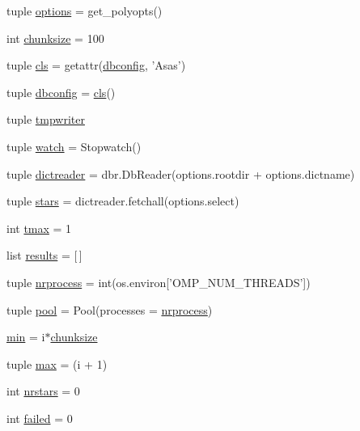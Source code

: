 \begin{DoxyCompactItemize}
\item 
tuple \hyperlink{namespacerunpolymp_a1696f14ff027e064a7d29eece7f4b66d}{options} = get\_\-polyopts()
\item 
int \hyperlink{namespacerunpolymp_aa79092d87180be0a238a99f8f9d7bef4}{chunksize} = 100
\item 
tuple \hyperlink{namespacerunpolymp_a792265f8b2a708d4ce5fdb59becb528a}{cls} = getattr(\hyperlink{namespacerunpolymp_af34401144c456e1951c68c99f91d5249}{dbconfig}, 'Asas')
\item 
tuple \hyperlink{namespacerunpolymp_af34401144c456e1951c68c99f91d5249}{dbconfig} = \hyperlink{namespacerunpolymp_a792265f8b2a708d4ce5fdb59becb528a}{cls}()
\item 
tuple \hyperlink{namespacerunpolymp_aba94d82f438bb9df93a754960d02b06a}{tmpwriter}
\item 
tuple \hyperlink{namespacerunpolymp_add54abd046ac5d9e780e62ea08417fbe}{watch} = Stopwatch()
\item 
tuple \hyperlink{namespacerunpolymp_a59d220b1ff9a930fe2889535b8835d13}{dictreader} = dbr.DbReader(options.rootdir + options.dictname)
\item 
tuple \hyperlink{namespacerunpolymp_a953b76537f2a9528d9e7ffdaab48614d}{stars} = dictreader.fetchall(options.select)
\item 
int \hyperlink{namespacerunpolymp_af5937209128980a2d0e0c0b9bb157b85}{tmax} = 1
\item 
list \hyperlink{namespacerunpolymp_af260c9116ecebd8a092ec6a918e3742a}{results} = \mbox{[}$\,$\mbox{]}
\item 
tuple \hyperlink{namespacerunpolymp_a61267842b66dc6998ce42d9c4446992b}{nrprocess} = int(os.environ\mbox{[}'OMP\_\-NUM\_\-THREADS'\mbox{]})
\item 
tuple \hyperlink{namespacerunpolymp_ab3ab11d6f45802c04f361e52f3695bf3}{pool} = Pool(processes = \hyperlink{namespacerunpolymp_a61267842b66dc6998ce42d9c4446992b}{nrprocess})
\item 
\hyperlink{namespacerunpolymp_a4618edf2a059e4987f52db767ffb6d4d}{min} = i$\ast$\hyperlink{namespacerunpolymp_aa79092d87180be0a238a99f8f9d7bef4}{chunksize}
\item 
tuple \hyperlink{namespacerunpolymp_ae92e281387570c7fc239c7c639ac57d6}{max} = (i + 1)
\item 
int \hyperlink{namespacerunpolymp_a9bed810afed37bd8bc94fb240f3a836c}{nrstars} = 0
\item 
int \hyperlink{namespacerunpolymp_a0c32d94825e8d3aa839ff639347ef697}{failed} = 0
\end{DoxyCompactItemize}


